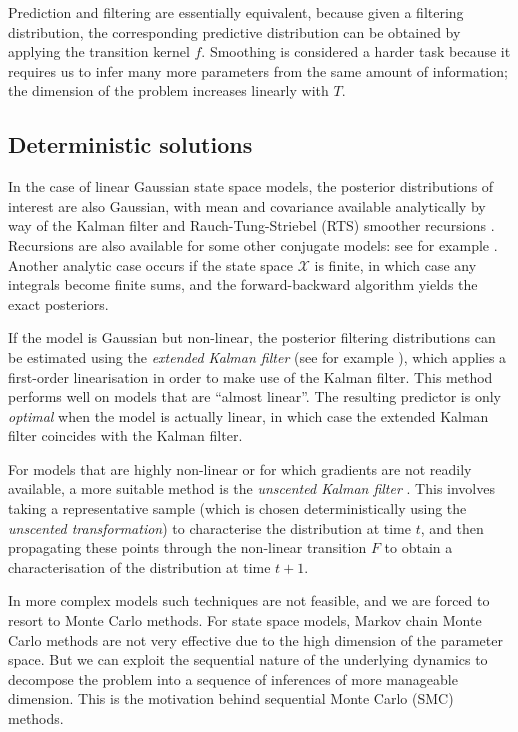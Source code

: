 \documentclass[fleqn]{article}
\theoremstyle{definition}
\begin{document}
Prediction and filtering are essentially equivalent, because given a filtering distribution, the corresponding predictive distribution can be obtained by applying the transition kernel $f$.
Smoothing is considered a harder task because it requires us to infer many more parameters from the same amount of information; the dimension of the problem increases linearly with $T$.

\subsection{Deterministic solutions}
In the case of linear Gaussian state space models, the posterior distributions of interest are also Gaussian, with mean and covariance available analytically by way of the Kalman filter \citep{kalman1960} and Rauch-Tung-Striebel (RTS) smoother recursions \citep{rauch1965}. Recursions are also available for some other conjugate models: see for example \citet{vidoni1999}.
Another analytic case occurs if the state space $\mathcal{X}$ is finite, in which case any integrals become finite sums, and the forward-backward algorithm \citep{baum1970} yields the exact posteriors.

If the model is Gaussian but non-linear, the posterior filtering distributions can be estimated using the \emph{extended Kalman filter} (see for example \citet{jazwinski2007}), which applies a first-order linearisation in order to make use of the Kalman filter. This method performs well on models that are ``almost linear''. The resulting predictor is only \emph{optimal} when the model is actually linear, in which case the extended Kalman filter coincides with the Kalman filter.

For models that are highly non-linear or for which gradients are not readily available, a more suitable method is the \emph{unscented Kalman filter} \citep{wan2000}. This involves taking a representative sample (which is chosen deterministically using the \emph{unscented transformation}) to characterise the distribution at time $t$, and then propagating these points through the non-linear transition $F$ to obtain a characterisation of the distribution at time $t+1$.

In more complex models such techniques are not feasible, and we are forced to resort to Monte Carlo methods.
For state space models, Markov chain Monte Carlo methods are not very effective due to the high dimension of the parameter space. But we can exploit the sequential nature of the underlying dynamics to decompose the problem into a sequence of inferences of more manageable dimension.
This is the motivation behind sequential Monte Carlo (SMC) methods.
\end{document}
